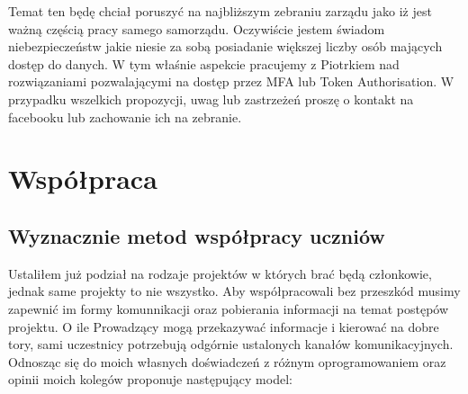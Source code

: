 \documentclass[9pt,a4paper]{report}
\begin{document}
Temat ten będę chciał poruszyć na najbliższym zebraniu zarządu jako iż jest ważną częścią pracy samego samorządu. Oczywiście jestem świadom niebezpieczeństw jakie niesie za sobą posiadanie większej liczby osób mających dostęp do danych. W tym właśnie aspekcie pracujemy z Piotrkiem nad rozwiązaniami pozwalającymi na dostęp przez MFA lub Token Authorisation. W przypadku wszelkich propozycji, uwag lub zastrzeżeń proszę o kontakt na facebooku lub zachowanie ich na zebranie.

\chapter{Współpraca}

\section{Wyznacznie metod współpracy uczniów}
Ustaliłem już podział na rodzaje projektów w których brać będą członkowie, jednak same projekty to nie wszystko. Aby współpracowali bez przeszkód musimy zapewnić im formy komunnikacji oraz pobierania informacji na temat postępów projektu. O ile Prowadzący mogą przekazywać informacje i kierować na dobre tory, sami uczestnicy potrzebują odgórnie ustalonych kanałów komunikacyjnych. Odnosząc się do moich własnych doświadczeń z różnym oprogramowaniem oraz opinii moich kolegów proponuje następujący model:\\\\
\end{document}
